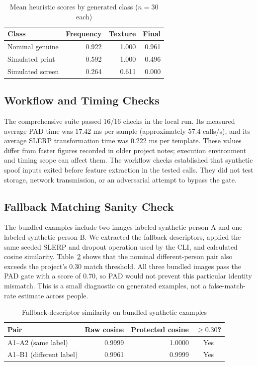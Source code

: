 \documentclass[conference,10pt]{IEEEtran}
\begin{document}
\begin{table}[t]
\caption{Mean heuristic scores by generated class ($n=30$ each)}
\label{tab:components}
\centering\footnotesize
\begin{tabular}{@{}lrrr@{}}
\toprule
Class & Frequency & Texture & Final\\
\midrule
Nominal genuine & 0.922 & 1.000 & 0.961\\
Simulated print & 0.592 & 1.000 & 0.496\\
Simulated screen & 0.264 & 0.611 & 0.000\\
\bottomrule
\end{tabular}
\end{table}

\subsection{Workflow and Timing Checks}

The comprehensive suite passed 16/16 checks in the local run. Its measured average PAD time was 17.42 ms per sample (approximately 57.4 calls/s), and its average SLERP transformation time was 0.222 ms per template. These values differ from faster figures recorded in older project notes; execution environment and timing scope can affect them. The workflow checks established that synthetic spoof inputs exited before feature extraction in the tested calls. They did not test storage, network transmission, or an adversarial attempt to bypass the gate.

\subsection{Fallback Matching Sanity Check}
The bundled examples include two images labeled synthetic person A and one labeled synthetic person B. We extracted the fallback descriptors, applied the same seeded SLERP and dropout operation used by the CLI, and calculated cosine similarity. Table~\ref{tab:matching} shows that the nominal different-person pair also exceeds the project's 0.30 match threshold. All three bundled images pass the PAD gate with a score of 0.70, so PAD would not prevent this particular identity mismatch. This is a small diagnostic on generated examples, not a false-match-rate estimate across people.

\begin{table}[t]
\caption{Fallback-descriptor similarity on bundled synthetic examples}
\label{tab:matching}
\centering\footnotesize
\setlength{\tabcolsep}{4pt}
\begin{tabular}{@{}lrrc@{}}
\toprule
Pair & Raw cosine & Protected cosine & $\geq0.30$?\\
\midrule
A1--A2 (same label) & 0.9999 & 1.0000 & Yes\\
A1--B1 (different label) & 0.9961 & 0.9999 & Yes\\
\bottomrule
\end{tabular}
\end{table}
\end{document}
